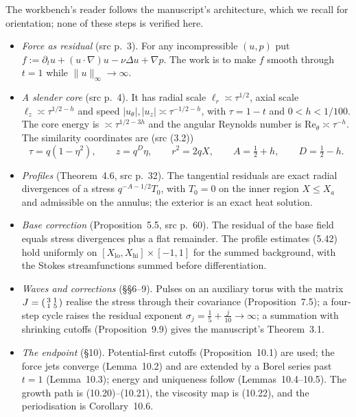 The workbench's reader follows the manuscript's architecture, which we recall for orientation; none of these steps is verified here.
\begin{itemize}
\item \emph{Force as residual} (src p.~3). For any incompressible $(u,p)$ put $f:=\partial_tu+(u\cdot\nabla)u-\nu\Delta u+\nabla p$. The work is to make $f$ smooth through $t=1$ while $\|u\|_\infty\to\infty$.
\item \emph{A slender core} (src p.~4). It has radial scale $\ell_r\asymp\tau^{1/2}$, axial scale $\ell_z\asymp\tau^{1/2-h}$ and speed $|u_\theta|,|u_z|\asymp\tau^{-1/2-h}$, with $\tau=1-t$ and $0<h<1/100$. The core energy is $\asymp\tau^{1/2-3h}$ and the angular Reynolds number is $\mathrm{Re}_\theta\asymp\tau^{-h}$. The similarity coordinates are (src (3.2))
\[
\tau=q(1-\eta^2),\qquad z=q^D\eta,\qquad r^2=2qX,\qquad A=\tfrac12+h,\qquad D=\tfrac12-h.
\]
\item \emph{Profiles} (Theorem~4.6, src p.~32). The tangential residuals are exact radial divergences of a stress $q^{-A-1/2}T_0$, with $T_0=0$ on the inner region $X\le X_a$ and admissible on the annulus; the exterior is an exact heat solution.
\item \emph{Base correction} (Proposition~5.5, src p.~60). The residual of the base field equals stress divergences plus a flat remainder. The profile estimates (5.42) hold uniformly on $[X_{\mathrm{lo}},X_{\mathrm{hi}}]\times[-1,1]$ for the summed background, with the Stokes streamfunctions summed before differentiation.
\item \emph{Waves and corrections} (§§6--9). Pulses on an auxiliary torus with the matrix $J=\begin{psmallmatrix}3&1\\1&5\end{psmallmatrix}$ realise the stress through their covariance (Proposition~7.5); a four-step cycle raises the residual exponent $\sigma_j=\frac15+\frac j{10}\to\infty$; a summation with shrinking cutoffs (Proposition~9.9) gives the manuscript's Theorem~3.1.
\item \emph{The endpoint} (§10). Potential-first cutoffs (Proposition~10.1) are used; the force jets converge (Lemma~10.2) and are extended by a Borel series past $t=1$ (Lemma~10.3); energy and uniqueness follow (Lemmas~10.4--10.5). The growth path is (10.20)--(10.21), the viscosity map is (10.22), and the periodisation is Corollary~10.6.
\end{itemize}

